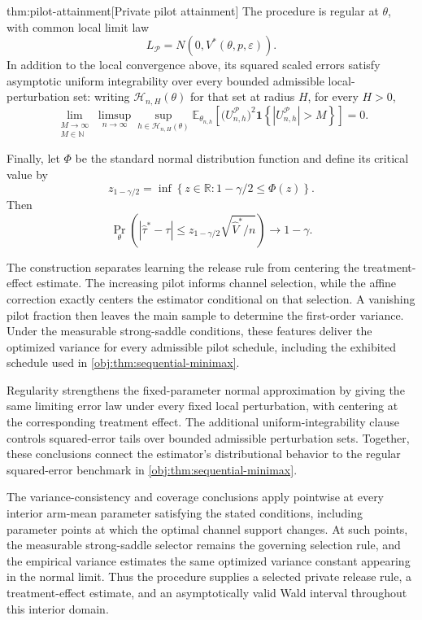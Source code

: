 \begin{theoremv}{thm:pilot-attainment}[Private pilot attainment]
The procedure is regular at \(\theta\), with common local limit law
\[
L_{\mathcal P}=N\!\left(0,V^*(\theta,p,\varepsilon)\right).
\]
In addition to the local convergence above, its squared scaled errors satisfy asymptotic uniform integrability over every bounded admissible local-perturbation set: writing \(\mathcal H_{n,H}(\theta)\) for that set at radius \(H\), for every \(H>0\),
\[
\lim_{\substack{M\to\infty\\ M\in\mathbb N}}
\limsup_{n\to\infty}
\sup_{h\in\mathcal H_{n,H}(\theta)}
\mathbb E_{\theta_{n,h}}\!\left[
\bigl(U_{n,h}^{\mathcal P}\bigr)^2
\mathbf 1\!\left\{\left|U_{n,h}^{\mathcal P}\right|>M\right\}
\right]
=0.
\]

Finally, let \(\Phi\) be the standard normal distribution function and define its critical value by
\[
z_{1-\gamma/2}
=
\inf\left\{z\in\mathbb R:1-\gamma/2\le\Phi(z)\right\}.
\]
Then
\[
\Pr_{\theta}\!\left(
\left|\widehat\tau^*-\tau\right|
\le z_{1-\gamma/2}\sqrt{\widehat V^*/n}
\right)\longrightarrow1-\gamma.
\]
\end{theoremv}

The construction separates learning the release rule from centering the treatment-effect estimate. The increasing pilot informs channel selection, while the affine correction exactly centers the estimator conditional on that selection. A vanishing pilot fraction then leaves the main sample to determine the first-order variance. Under the measurable strong-saddle conditions, these features deliver the optimized variance for every admissible pilot schedule, including the exhibited schedule used in \cref{obj:thm:sequential-minimax}.

Regularity strengthens the fixed-parameter normal approximation by giving the same limiting error law under every fixed local perturbation, with centering at the corresponding treatment effect. The additional uniform-integrability clause controls squared-error tails over bounded admissible perturbation sets. Together, these conclusions connect the estimator's distributional behavior to the regular squared-error benchmark in \cref{obj:thm:sequential-minimax}.

The variance-consistency and coverage conclusions apply pointwise at every interior arm-mean parameter satisfying the stated conditions, including parameter points at which the optimal channel support changes. At such points, the measurable strong-saddle selector remains the governing selection rule, and the empirical variance estimates the same optimized variance constant appearing in the normal limit. Thus the procedure supplies a selected private release rule, a treatment-effect estimate, and an asymptotically valid Wald interval throughout this interior domain.
